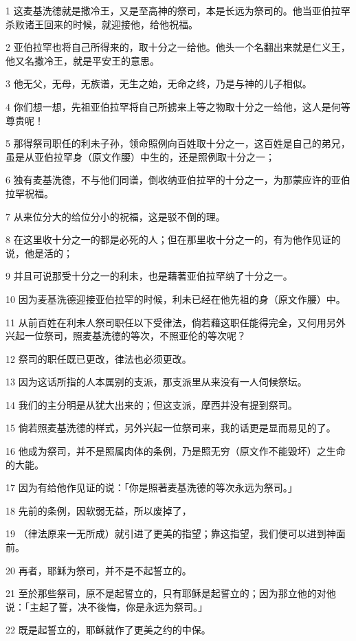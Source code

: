 \par 1 这麦基洗德就是撒冷王，又是至高神的祭司，本是长远为祭司的。他当亚伯拉罕杀败诸王回来的时候，就迎接他，给他祝福。
\par 2 亚伯拉罕也将自己所得来的，取十分之一给他。他头一个名翻出来就是仁义王，他又名撒冷王，就是平安王的意思。
\par 3 他无父，无母，无族谱，无生之始，无命之终，乃是与神的儿子相似。
\par 4 你们想一想，先祖亚伯拉罕将自己所掳来上等之物取十分之一给他，这人是何等尊贵呢！
\par 5 那得祭司职任的利未子孙，领命照例向百姓取十分之一，这百姓是自己的弟兄，虽是从亚伯拉罕身（原文作腰）中生的，还是照例取十分之一；
\par 6 独有麦基洗德，不与他们同谱，倒收纳亚伯拉罕的十分之一，为那蒙应许的亚伯拉罕祝福。
\par 7 从来位分大的给位分小的祝福，这是驳不倒的理。
\par 8 在这里收十分之一的都是必死的人；但在那里收十分之一的，有为他作见证的说，他是活的；
\par 9 并且可说那受十分之一的利未，也是藉著亚伯拉罕纳了十分之一。
\par 10 因为麦基洗德迎接亚伯拉罕的时候，利未已经在他先祖的身（原文作腰）中。
\par 11 从前百姓在利未人祭司职任以下受律法，倘若藉这职任能得完全，又何用另外兴起一位祭司，照麦基洗德的等次，不照亚伦的等次呢？
\par 12 祭司的职任既已更改，律法也必须更改。
\par 13 因为这话所指的人本属别的支派，那支派里从来没有一人伺候祭坛。
\par 14 我们的主分明是从犹大出来的；但这支派，摩西并没有提到祭司。
\par 15 倘若照麦基洗德的样式，另外兴起一位祭司来，我的话更是显而易见的了。
\par 16 他成为祭司，并不是照属肉体的条例，乃是照无穷（原文作不能毁坏）之生命的大能。
\par 17 因为有给他作见证的说：「你是照著麦基洗德的等次永远为祭司。」
\par 18 先前的条例，因软弱无益，所以废掉了，
\par 19 （律法原来一无所成）就引进了更美的指望；靠这指望，我们便可以进到神面前。
\par 20 再者，耶稣为祭司，并不是不起誓立的。
\par 21 至於那些祭司，原不是起誓立的，只有耶稣是起誓立的；因为那立他的对他说：「主起了誓，决不後悔，你是永远为祭司。」
\par 22 既是起誓立的，耶稣就作了更美之约的中保。
